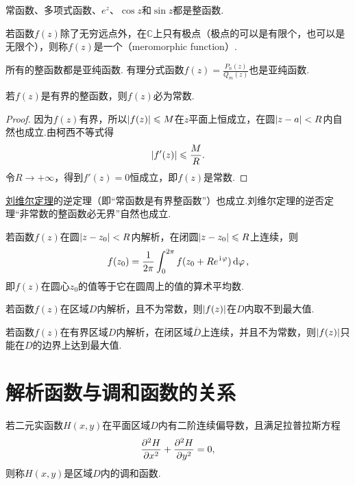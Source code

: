\begin{example}
常函数、多项式函数、\(e^z\)、\(\cos z\)和\(\sin z\)都是整函数.
\end{example}

\begin{definition}
若函数\(f(z)\)除了无穷远点外，在\(\mathbb{C}\)上只有极点（极点的可以是有限个，也可以是无限个），则称\(f(z)\)是一个（meromorphic function）.
\end{definition}

\begin{example}
所有的整函数都是亚纯函数.
有理分式函数\(f(z) = \frac{P_n(z)}{Q_m(z)}\)也是亚纯函数.
\end{example}

\begin{theorem}\label{theorem:解析函数的积分表示.刘维尔定理}
若\(f(z)\)是有界的整函数，则\(f(z)\)必为常数.
\begin{proof}
因为\(f(z)\)有界，所以\(\abs{f(z)} \leqslant M\)在\(z\)平面上恒成立，在圆\(\abs{z-a}<R\)内自然也成立.由柯西不等式得\[
\abs{f'(z)} \leqslant \frac{M}{R}.
\]令\(R\to+\infty\)，得到\(f'(z)=0\)恒成立，即\(f(z)\)是常数.
\end{proof}
\end{theorem}
\hyperref[theorem:解析函数的积分表示.刘维尔定理]{刘维尔定理}的逆定理（即“常函数是有界整函数”）也成立.刘维尔定理的逆否定理“非常数的整函数必无界”自然也成立.

\begin{theorem}[解析函数的平均值定理]\label{theorem:解析函数的积分表示.平均值定理}
若函数\(f(z)\)在圆\(\abs{z-z_0}<R\)内解析，在闭圆\(\abs{z-z_0} \leqslant R\)上连续，则\[
f(z_0) = \frac{1}{2\pi} \int_0^{2\pi} f(z_0+Re^{\kern1pt\mathrm{i}\kern1pt\varphi}) \dd{\varphi},
\]即\(f(z)\)在圆心\(z_0\)的值等于它在圆周上的值的算术平均数.
\end{theorem}

\begin{theorem}[最大模定理]\label{theorem:解析函数的积分表示.最大模定理}
若函数\(f(z)\)在区域\(D\)内解析，且不为常数，则\(\abs{f(z)}\)在\(D\)内取不到最大值.
\end{theorem}

\begin{corollary}\label{theorem:解析函数的积分表示.最大模定理推论}
若函数\(f(z)\)在有界区域\(D\)内解析，在闭区域\(\overline{D}\)上连续，并且不为常数，则\(\abs{f(z)}\)只能在\(D\)的边界上达到最大值.
\end{corollary}

\section{解析函数与调和函数的关系}
\begin{definition}
若二元实函数\(H(x,y)\)在平面区域\(D\)内有二阶连续偏导数，且满足拉普拉斯方程\[
\pdv[2]{H}{x} + \pdv[2]{H}{y} = 0,
\]则称\(H(x,y)\)是区域\(D\)内的调和函数.
\end{definition}

